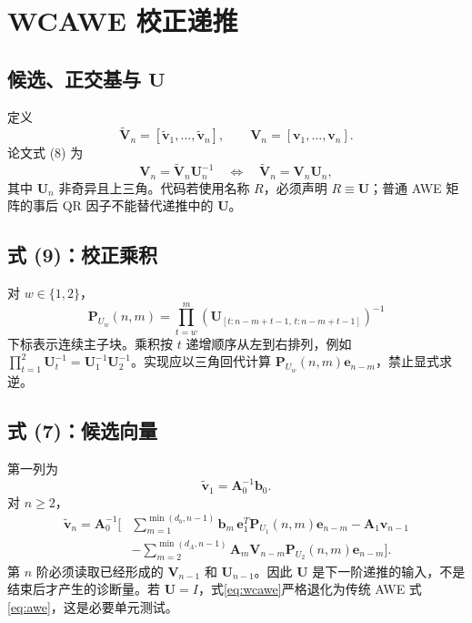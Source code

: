 \documentclass[11pt,a4paper]{ctexart}
\newcommand{\A}{\bm A}
\newcommand{\bvec}{\bm b}
\newcommand{\vvec}{\bm v}
\newcommand{\evec}{\bm e}
\newcommand{\Umat}{\bm U}
\newcommand{\Vmat}{\bm V}
\begin{document}
\section{WCAWE 校正递推}
\subsection{候选、正交基与 \texorpdfstring{$\Umat$}{U}}
定义
\begin{equation}
\widetilde{\Vmat}_n=[\widetilde{\vvec}_1,\ldots,\widetilde{\vvec}_n],\qquad
\Vmat_n=[\vvec_1,\ldots,\vvec_n].
\end{equation}
论文式 (8) 为
\begin{equation}
\boxed{\Vmat_n=\widetilde{\Vmat}_n\Umat_n^{-1}}
\quad\Longleftrightarrow\quad
\widetilde{\Vmat}_n=\Vmat_n\Umat_n,
\label{eq:vu}
\end{equation}
其中 $\Umat_n$ 非奇异且上三角。代码若使用名称 $R$，必须声明 $R\equiv\Umat$；普通 AWE 矩阵的事后 QR 因子不能替代递推中的 $\Umat$。

\subsection{式 (9)：校正乘积}
对 $w\in\{1,2\}$，
\begin{equation}
\boxed{
\bm P_{U_w}(n,m)=\prod_{t=w}^{m}
\left(\Umat_{[t:n-m+t-1,\,t:n-m+t-1]}\right)^{-1}}
\label{eq:pu}
\end{equation}
下标表示连续主子块。乘积按 $t$ 递增顺序从左到右排列，例如 $\prod_{t=1}^{2}\Umat_t^{-1}=\Umat_1^{-1}\Umat_2^{-1}$。实现应以三角回代计算 $\bm P_{U_w}(n,m)\evec_{n-m}$，禁止显式求逆。

\subsection{式 (7)：候选向量}
第一列为
\begin{equation}
\widetilde{\vvec}_1=\A_0^{-1}\bvec_0.
\end{equation}
对 $n\ge2$，
\begin{equation}
\boxed{
\begin{aligned}
\widetilde{\vvec}_n=\A_0^{-1}\Bigg[&
\sum_{m=1}^{\min(d_b,n-1)}
\bvec_m\,\evec_1^T\bm P_{U_1}(n,m)\evec_{n-m}
-\A_1\vvec_{n-1}\\
&-\sum_{m=2}^{\min(d_A,n-1)}
\A_m\Vmat_{n-m}\bm P_{U_2}(n,m)\evec_{n-m}
\Bigg].
\end{aligned}}
\label{eq:wcawe}
\end{equation}
第 $n$ 阶必须读取已经形成的 $\Vmat_{n-1}$ 和 $\Umat_{n-1}$。因此 $\Umat$ 是下一阶递推的输入，不是结束后才产生的诊断量。若 $\Umat=I$，式\eqref{eq:wcawe}严格退化为传统 AWE 式\eqref{eq:awe}，这是必要单元测试。
\end{document}
